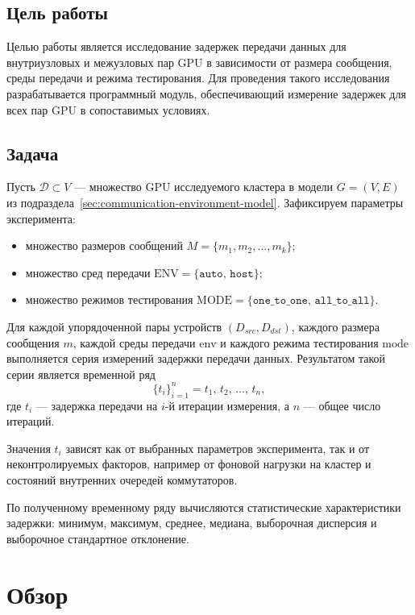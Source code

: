 \documentclass[a4paper,14pt]{extarticle}
\begin{document}
\subsection{Цель работы}
\indent Целью работы является исследование задержек передачи данных для внутриузловых и межузловых пар GPU в зависимости от размера сообщения, среды передачи и режима тестирования. Для проведения такого исследования разрабатывается программный модуль, обеспечивающий измерение задержек для всех пар GPU в сопоставимых условиях.

\subsection{Задача}
\indent Пусть $\mathcal{D} \subset V$ --- множество GPU исследуемого кластера в модели $G = (V, E)$ из подраздела~\ref{sec:communication-environment-model}. Зафиксируем параметры эксперимента:
\begin{itemize}[leftmargin=2.1cm, itemsep=0.15em, topsep=0.15em, parsep=0pt, partopsep=0pt]
	\item множество размеров сообщений $M = \{m_1, m_2, \ldots, m_k\}$;
	\item множество сред передачи $\mathrm{ENV} = \{\texttt{auto},\,\texttt{host}\}$;
	\item множество режимов тестирования $\mathrm{MODE} = \{\texttt{one\_to\_one},\,\texttt{all\_to\_all}\}$.
\end{itemize}

\indent Для каждой упорядоченной пары устройств $(D_{src}, D_{dst})$, каждого размера сообщения $m$, каждой среды передачи $\mathrm{env}$ и каждого режима тестирования $\mathrm{mode}$ выполняется серия измерений задержки передачи данных. Результатом такой серии является временной ряд
\[
	\{t_i\}_{i=1}^{n} = t_1,\, t_2,\, \ldots,\, t_n,
\]
где $t_i$ --- задержка передачи на $i$-й итерации измерения, а $n$ --- общее число итераций.

\indent Значения $t_i$ зависят как от выбранных параметров эксперимента, так и от неконтролируемых факторов, например от фоновой нагрузки на кластер и состояний внутренних очередей коммутаторов.

\indent По полученному временному ряду вычисляются статистические характеристики задержки: минимум, максимум, среднее, медиана, выборочная дисперсия и выборочное стандартное отклонение.

\newpage
\section{Обзор}
\end{document}
